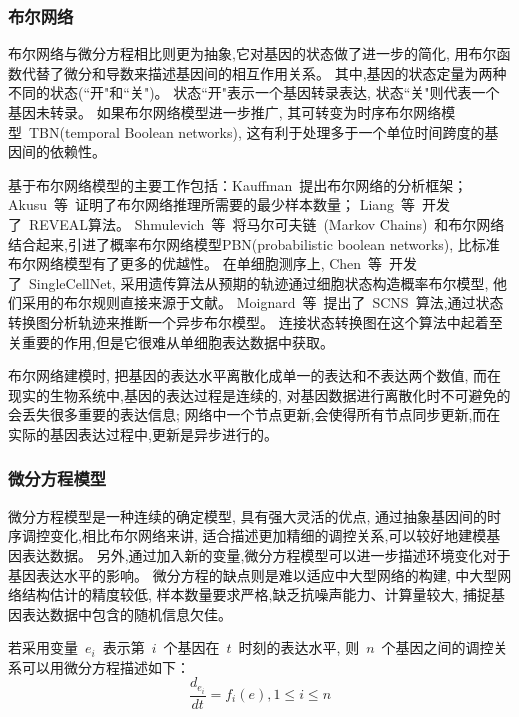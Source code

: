 \subsubsection{布尔网络}
布尔网络与微分方程相比则更为抽象,它对基因的状态做了进一步的简化,
用布尔函数代替了微分和导数来描述基因间的相互作用关系。
其中,基因的状态定量为两种不同的状态(``开"和``关")。
状态``开"表示一个基因转录表达, 状态``关"则代表一个基因未转录。
如果布尔网络模型进一步推广, 其可转变为时序布尔网络模型~TBN(temporal Boolean networks), 这有利于处理多于一个单位时间跨度的基因间的依赖性。

基于布尔网络模型的主要工作包括：Kauffman~\cite{kauffman2003random}提出布尔网络的分析框架；
Akusu~等~\cite{akutsu1999identification}证明了布尔网络推理所需要的最少样本数量；
Liang~等~\cite{liang1998reveal}开发了~REVEAL算法。
Shmulevich~等~\cite{marshall2007inference}将马尔可夫链~(Markov Chains)~和布尔网络结合起来,引进了概率布尔网络模型PBN(probabilistic boolean networks),
比标准布尔网络模型有了更多的优越性。
在单细胞测序上,
Chen~等~\cite{chen2014single}开发了~SingleCellNet,
采用遗传算法从预期的轨迹通过细胞状态构造概率布尔模型, 他们采用的布尔规则直接来源于文献。
Moignard~等~\cite{moignard2015decoding}提出了~SCNS~算法,通过状态转换图分析轨迹来推断一个异步布尔模型。
连接状态转换图在这个算法中起着至关重要的作用,但是它很难从单细胞表达数据中获取。

布尔网络建模时, 把基因的表达水平离散化成单一的表达和不表达两个数值,
而在现实的生物系统中,基因的表达过程是连续的,
对基因数据进行离散化时不可避免的会丢失很多重要的表达信息;
网络中一个节点更新,会使得所有节点同步更新,而在实际的基因表达过程中,更新是异步进行的。

\subsubsection{微分方程模型}
微分方程模型是一种连续的确定模型, 具有强大灵活的优点,
通过抽象基因间的时序调控变化,相比布尔网络来讲, 适合描述更加精细的调控关系,可以较好地建模基因表达数据。
另外,通过加入新的变量,微分方程模型可以进一步描述环境变化对于基因表达水平的影响。
微分方程的缺点则是难以适应中大型网络的构建, 中大型网络结构估计的精度较低,
样本数量要求严格,缺乏抗噪声能力、计算量较大, 捕捉基因表达数据中包含的随机信息欠佳。

若采用变量~$e_i$~表示第~$i$~个基因在~$t$~时刻的表达水平, 则~$n$~个基因之间的调控关系可以用微分方程描述如下：
\begin{equation}
\frac{{d_{e_i}}}{{dt}} = f_i (e),1 \le i \le n
\end{equation}

